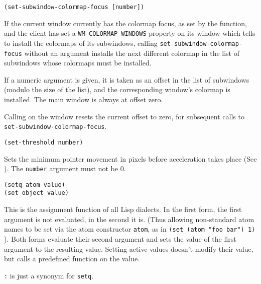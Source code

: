 
{\usagefont\begin{verbatim}
(set-subwindow-colormap-focus [number])
\end{verbatim}}\usageupspace

If the current window currently has the colormap focus, as set
by the  function, and the client has set a
\verb"WM_COLORMAP_WINDOWS" property on its window which tells 
{\GWM} to install
the colormaps of its subwindows, calling \verb"set-subwindow-colormap-focus"
without an argument installs the next different colormap in the list of
subwindows whose colormaps must be installed.

If a numeric argument is given, it is taken as an offset in the list of
subwindows (modulo the size of the list), and the corresponding window's
colormap is installed. The main window is always at offset zero.

Calling  on the window resets the current offset
to zero, for subsequent calls to \verb"set-subwindow-colormap-focus".


        
{\usagefont\begin{verbatim}
(set-threshold number)
\end{verbatim}}\usageupspace

Sets the minimum pointer movement in pixels before acceleration takes place
(See ). The \verb"number" argument must not be 0.

        
{\usagefont\begin{verbatim}
(setq atom value)
(set object value)
\end{verbatim}}\usageupspace

This is the assignment function of all Lisp dialects. In the first form,
the first argument is not evaluated, in the second it is.
(Thus allowing non-standard atom names to be set via the atom constructor
\verb"atom", as in \verb|(set (atom "foo bar") 1)| ). Both forms evaluate 
their second
argument and sets the value of the first argument to the resulting
value. Setting active values
doesn't modify their value, but calls a predefined function on the value.

\verb":" is just a synonym for \verb"setq".


